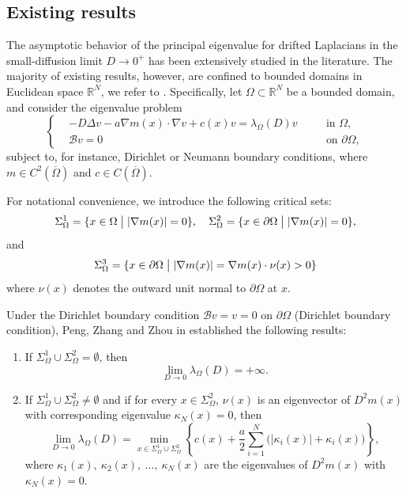 \documentclass[12pt,reqno]{amsart}
\numberwithin{equation}{section}
\begin{document}
\subsection{Existing results}
The asymptotic behavior of the principal eigenvalue for drifted Laplacians in the small-diffusion limit $D \to 0^+$ has been extensively studied in the literature. The majority of existing results, however, are confined to bounded domains in Euclidean space $\mathbb{R}^N$, we refer to \cite{CL12,PZZ19}. Specifically, let $\Omega \subset \mathbb{R}^N$ be a bounded domain, and consider the eigenvalue problem
\begin{equation}\label{E_Euclidean}
\left\{
\begin{aligned}
&-D\Delta v - a \nabla m(x)\cdot \nabla v + c(x)v = \lambda_{\Omega}(D)v \quad &&\text{in } \Omega,\\
&\mathcal{B}v = 0 \quad &&\text{on } \partial\Omega,
\end{aligned}
\right.
\end{equation}
subject to, for instance, Dirichlet or Neumann boundary conditions, where $m \in C^2(\overline{\Omega})$ and $c \in C(\overline{\Omega})$.


For notational convenience, we introduce the following critical sets: 
$$\Sigma_{\Omega}^1=\{x\in \Omega\bigm| |\nabla m(x)|=0 \},\quad \Sigma_{\Omega}^2=\{x\in \partial\Omega\bigm| |\nabla m(x)|=0 \},$$ 
and $$\Sigma_{\Omega}^3=\{x\in \partial\Omega\bigm| |\nabla m(x)|=\nabla m(x)\cdot \nu(x)>0 \}
 $$
where $\nu(x)$ denotes the outward unit normal to $\partial\Omega$ at $x$.


Under the Dirichlet boundary condition $\mathcal{B}v=v=0$ on $\partial \Omega$ (Dirichlet boundary condition), Peng, Zhang and Zhou in \cite{PZZ19} established the following results:
\begin{enumerate}
\item[(i)]
If $\Sigma_{\Omega}^1\cup\Sigma_{\Omega}^2=\emptyset$, then
\[
\lim_{D\to0}\lambda_{\Omega}(D)=+\infty.
\]

\item[(ii)]
If $\Sigma_{\Omega}^1\cup\Sigma_{\Omega}^2\neq\emptyset$ and if for every
$x\in\Sigma_{\Omega}^2$, $\nu(x)$ is an eigenvector of $D^2m(x)$ with corresponding eigenvalue $\kappa_N(x)=0$, then
\[
\lim_{D\to0}\lambda_{\Omega}(D)
=
\min_{x\in\Sigma_{\Omega}^1\cup\Sigma_{\Omega}^2}
\left\{
c(x)
+\frac{a}{2}
\sum_{i=1}^{N}
\bigl(|\kappa_i(x)|+\kappa_i(x)\bigr)
\right\},
\]
where $\kappa_1(x),\ \kappa_2(x),\ \ldots,\ \kappa_N(x)$
are the eigenvalues of $D^2m(x)$ with $\kappa_N(x)=0$.
\end{enumerate}
\end{document}
